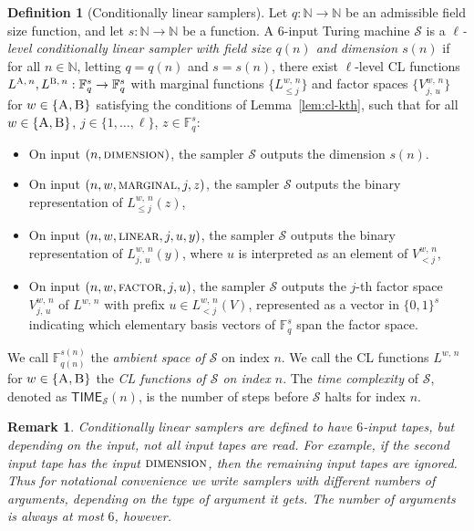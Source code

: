 \documentclass[11pt]{article}
\newtheorem{remark}[theorem]{Remark}
\theoremstyle{definition}
\newtheorem{definition}[theorem]{Definition}
\newcommand{\N}{\ensuremath{\mathbb{N}}}
\newcommand{\F}{\ensuremath{\mathbb{F}}}
\newcommand{\sampler}{\mathcal{S}}
\newcommand{\gamestyle}[1]{\ensuremath{\textsc{#1}}\xspace}
\newcommand{\labelstyle}[1]{\ensuremath{\textsc{#1}}\xspace}
\newcommand{\alice}{\labelstyle{A}}
\newcommand{\bob}{\labelstyle{B}}
\newcommand{\ab}{\{\alice, \bob\}}
\newcommand{\AB}{\{\alice, \bob\}}
\newcommand{\TIME}{\mathsf{TIME}}
\begin{document}
\begin{definition}[Conditionally linear samplers]
  \label{def:sampler}
	Let $q:\N \to \N$ be an admissible field size function, and let $s: \N \to \N$
  be a function.
  A $6$-input Turing machine $\sampler$ is a \emph{$\ell$-level conditionally
    linear sampler with field size $q(n)$ and dimension $s(n)$} if for all $n
  \in \N$, letting $q = q(n)$ and $s = s(n)$, there exist $\ell$-level CL
  functions $L^{\alice,\, n}, L^{\bob,\, n} : \F_q^s \to \F_q^s$ with marginal functions
  $\{ L^{w,\, n}_{\leq j}\}$ and factor spaces $\{V^{w,\, n}_{j,\, u}\}$ for $w \in \AB$
  satisfying the conditions of Lemma~\ref{lem:cl-kth}, such that for all $w \in
  \AB$, $j \in \{1,\ldots,\ell\}$, $z \in \F_q^s$:
  \begin{itemize}
  \item On input $(n, \gamestyle{dimension})$, the sampler $\sampler$ outputs the
    dimension $s(n)$.
  \item On input $(n, w, \gamestyle{marginal}, j, z)$, the sampler $\sampler$
    outputs the binary representation of $L^{w,\, n}_{\leq j}(z)$,
	 \item On input $(n, w, \gamestyle{linear}, j, u, y)$, the sampler $\sampler$
    outputs the binary representation of $L^{w,\, n}_{j,\, u}(y)$, where $u$ is
    interpreted as an element of $V^{w,\, n}_{<j}$,
	\item On input $(n, w, \gamestyle{factor}, j, u)$, the sampler $\sampler$
    outputs the $j$-th factor space $V^{w,\, n}_{j,\, u}$ of $L^{w,\, n}$ with
    prefix $u \in L^{w,\, n}_{<j}(V)$, represented as a vector in
    $\{0,1\}^s$ indicating which elementary basis vectors of $\F_q^s$ span the factor space.
  \end{itemize}
  We call $\F_{q(n)}^{s(n)}$ the \emph{ambient space of $\sampler$} on index $n$.
  We call the CL functions $L^{w,\, n}$ for $w \in \ab$ the \emph{CL functions
    of $\sampler$ on index $n$}.
  The \emph{time complexity} of $\sampler$, denoted as $\TIME_\sampler(n)$, is
  the number of steps before $\sampler$ halts for index $n$.
\end{definition}

\begin{remark}
  \label{rmk:sampler-inputs}
  Conditionally linear samplers are defined to have $6$-input tapes, but
  depending on the input, not all input tapes are read.
  For example, if the second input tape has the input $\gamestyle{dimension}$,
  then the remaining input tapes are ignored.
  Thus for notational convenience we write samplers with different numbers of
  arguments, depending on the type of argument it gets.
  The number of arguments is always at most $6$, however.
\end{remark}
\end{document}

